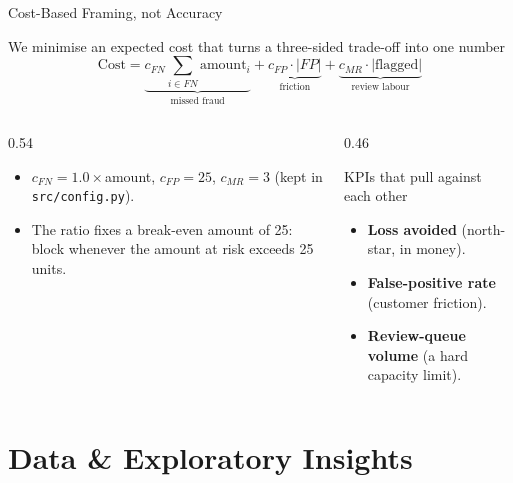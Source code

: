 \documentclass[t, aspectratio=169]{beamer} %
\begin{document}
\begin{frame}{Cost-Based Framing, not Accuracy}
	\begin{block}{We minimise an expected cost that turns a three-sided trade-off into one number}
		\[
		  \text{Cost} = \underbrace{c_{FN}\!\!\sum_{i\in FN}\!\text{amount}_i}_{\text{missed fraud}}
		  + \underbrace{c_{FP}\cdot|FP|}_{\text{friction}}
		  + \underbrace{c_{MR}\cdot|\text{flagged}|}_{\text{review labour}}
		\]
	\end{block}
	\begin{columns}[T]
		\begin{column}{0.54\textwidth}
			\begin{itemize}
				\item $c_{FN}=1.0\times$amount, $c_{FP}=25$, $c_{MR}=3$
				      (kept in \texttt{src/config.py}).
				\item The ratio fixes a \alert{break-even amount of 25}: block
				      whenever the amount at risk exceeds 25 units.
			\end{itemize}
		\end{column}
		\begin{column}{0.46\textwidth}
			\begin{alertblock}{KPIs that pull against each other}
				\begin{itemize}
					\item \textbf{Loss avoided} (north-star, in money).
					\item \textbf{False-positive rate} (customer friction).
					\item \textbf{Review-queue volume} (a hard capacity limit).
				\end{itemize}
			\end{alertblock}
		\end{column}
	\end{columns}
\end{frame}

\section{Data \& Exploratory Insights}
\end{document}
